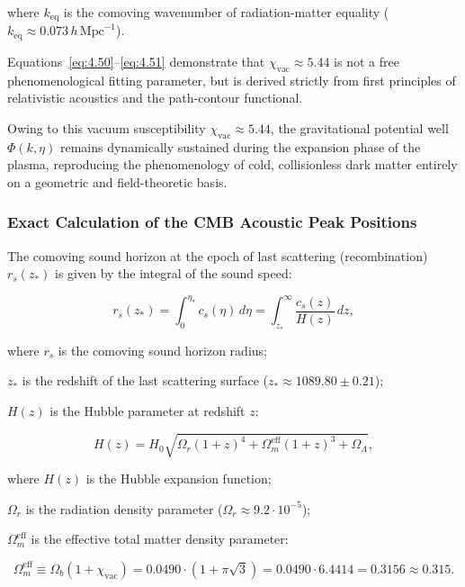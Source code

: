 \documentclass[11pt,a4paper]{article}
\theoremstyle{definition}
\begin{document}
where $k_{\text{eq}}$ is the comoving wavenumber of radiation-matter equality ($k_{\text{eq}} \approx 0.073\,h\,\text{Mpc}^{-1}$).

Equations~\eqref{eq:4.50}--\eqref{eq:4.51} demonstrate that $\chi_{\text{vac}} \approx 5.44$ is not a free phenomenological fitting parameter, but is derived strictly from first principles of relativistic acoustics and the path-contour functional.

Owing to this vacuum susceptibility $\chi_{\text{vac}} \approx 5.44$, the gravitational potential well $\Phi(k, \eta)$ remains dynamically sustained during the expansion phase of the plasma, reproducing the phenomenology of cold, collisionless dark matter entirely on a geometric and field-theoretic basis.


\subsubsection{Exact Calculation of the CMB Acoustic Peak Positions}\label{sec:4.4.3}

The comoving sound horizon at the epoch of last scattering (recombination) $r_s(z_*)$ is given by the integral of the sound speed:

\begin{equation}\label{eq:4.52}\tag{4.52}
r_s(z_*) = \int_0^{\eta_*} c_s(\eta) \, d\eta = \int_{z_*}^{\infty} \frac{c_s(z)}{H(z)} \, dz,
\end{equation}

where $r_s$ is the comoving sound horizon radius;  

$z_*$ is the redshift of the last scattering surface ($z_* \approx 1089.80 \pm 0.21$);  

$H(z)$ is the Hubble parameter at redshift $z$:

\begin{equation}\label{eq:4.53}\tag{4.53}
H(z) = H_0 \sqrt{\Omega_r (1+z)^4 + \Omega_m^{\text{eff}} (1+z)^3 + \Omega_\Lambda},
\end{equation}

where $H(z)$ is the Hubble expansion function;  

$\Omega_r$ is the radiation density parameter ($\Omega_r \approx 9.2 \cdot 10^{-5}$);  

$\Omega_m^{\text{eff}}$ is the effective total matter density parameter:

\begin{equation}\label{eq:4.54}\tag{4.54}
\Omega_m^{\text{eff}} \equiv \Omega_b (1 + \chi_{\text{vac}}) = 0.0490 \cdot (1 + \pi\sqrt{3}) = 0.0490 \cdot 6.4414 = \mathbf{0.3156} \approx \mathbf{0.315}.
\end{equation}
\end{document}
